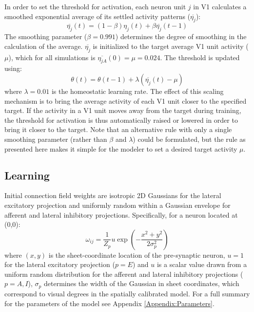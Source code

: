 In order to set the threshold for activation, each neuron unit $j$ in
V1 calculates a smoothed exponential average of its settled activity
patterns ($\overline{\eta_{j}}$):
\begin{equation}
\overline{\eta_{j}}(t)= (1-\beta)\eta_{j}(t) + \beta\overline{\eta_{j}}(t-1)
\label{eqn:averaging}
\end{equation}
The smoothing parameter ($\beta=0.991$) determines the degree of
smoothing in the calculation of the average. $\overline{\eta_{j}}$ is
initialized to the target average V1 unit activity ($\mu$), which for
all simulations is $\overline{\eta_{jA}}(0) = \mu= 0.024$. The
threshold is updated using:
\begin{equation}
\label{eqn:thresholdupdate}%
\theta(t)= \theta(t-1) + \lambda(\overline{\eta_{j}}(t) -\mu)
\end{equation}
where $\lambda=0.01$ is the homeostatic learning rate. The effect of
this scaling mechanism is to bring the average activity of each V1
unit closer to the specified target. If the activity in a V1 unit
moves away from the target during training, the threshold for
activation is thus automatically raised or lowered in order to bring
it closer to the target. Note that an alternative rule with only a
single smoothing parameter (rather than $\beta$ and $\lambda$) could
be formulated, but the rule as presented here makes it simple for the
modeler to set a desired target activity $\mu$.

\subsection*{Learning}

Initial connection field weights are isotropic 2D Gaussians for the
lateral excitatory projection and uniformly random within a Gaussian
envelope for afferent and lateral inhibitory
projections. Specifically, for a neuron located at (0,0):
\begin{equation}
\omega_{ij}=\frac{1}{Z_p}u\exp\left(-\frac{x^{2}+y^{2}}{2\sigma_{p}^{2}}\right)
\label{eqn:gaussrandomweights}
\end{equation}
where $(x, y)$ is the sheet-coordinate location of the pre-synaptic
neuron, $u=1$ for the lateral excitatory projection ($p=E$) and $u$ is
a scalar value drawn from a uniform random distribution for the
afferent and lateral inhibitory projections ($p=A,I$), $\sigma_{p}$
determines the width of the Gaussian in sheet coordinates, which
correspond to visual degrees in the spatially calibrated model. For a
full summary for the parameters of the model see Appendix
\ref{Appendix:Parameters}.

